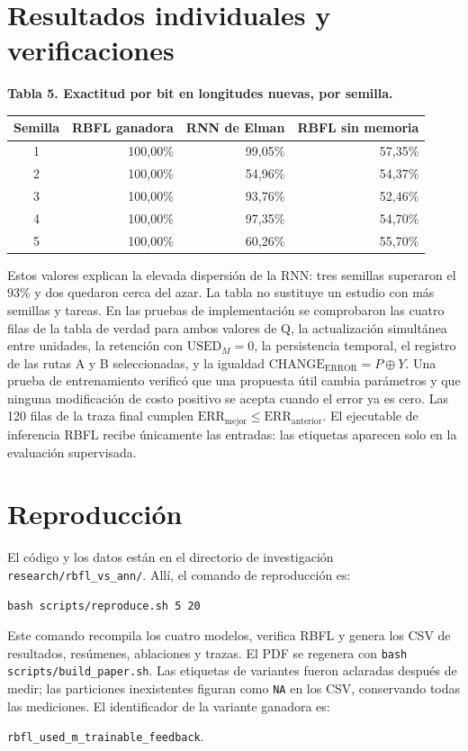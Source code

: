 \documentclass[10pt,a4paper]{article}
\newcommand{\UM}{\mathrm{USED}_{M}}
\newcommand{\CE}{\mathrm{CHANGE}_{\mathrm{ERROR}}}
\newenvironment{fixedtable}[1]{\par\medskip\noindent\begin{minipage}{\linewidth}\centering\small\textbf{#1}\par\smallskip}{\end{minipage}\par\medskip}
\begin{document}
\section{Resultados individuales y verificaciones}
\begin{fixedtable}{Tabla 5. Exactitud por bit en longitudes nuevas, por semilla.}
\begin{tabular}{crrr}
\toprule
Semilla & RBFL ganadora & RNN de Elman & RBFL sin memoria \\
\midrule
1 & 100,00\% & 99,05\% & 57,35\% \\
2 & 100,00\% & 54,96\% & 54,37\% \\
3 & 100,00\% & 93,76\% & 52,46\% \\
4 & 100,00\% & 97,35\% & 54,70\% \\
5 & 100,00\% & 60,26\% & 55,70\% \\
\bottomrule
\end{tabular}
\end{fixedtable}

Estos valores explican la elevada dispersión de la RNN: tres semillas superaron el 93\% y dos quedaron cerca del azar. La tabla no sustituye un estudio con más semillas y tareas. En las pruebas de implementación se comprobaron las cuatro filas de la tabla de verdad para ambos valores de Q, la actualización simultánea entre unidades, la retención con $\UM=0$, la persistencia temporal, el registro de las rutas A y B seleccionadas, y la igualdad $\CE=P\oplus Y$. Una prueba de entrenamiento verificó que una propuesta útil cambia parámetros y que ninguna modificación de costo positivo se acepta cuando el error ya es cero. Las 120 filas de la traza final cumplen $\mathrm{ERR}_{\mathrm{mejor}}\leq\mathrm{ERR}_{\mathrm{anterior}}$. El ejecutable de inferencia RBFL recibe únicamente las entradas: las etiquetas aparecen solo en la evaluación supervisada.

\section{Reproducción}
El código y los datos están en el directorio de investigación \texttt{research/rbfl\_vs\_ann/}. Allí, el comando de reproducción es:
\begin{center}\texttt{bash scripts/reproduce.sh 5 20}\end{center}
Este comando recompila los cuatro modelos, verifica RBFL y genera los CSV de resultados, resúmenes, ablaciones y trazas. El PDF se regenera con \texttt{bash scripts/build\_paper.sh}. Las etiquetas de variantes fueron aclaradas después de medir; las particiones inexistentes figuran como \texttt{NA} en los CSV, conservando todas las mediciones. El identificador de la variante ganadora es:
\begin{center}
\texttt{rbfl\_used\_m\_trainable\_feedback}.
\end{center}
\end{document}
